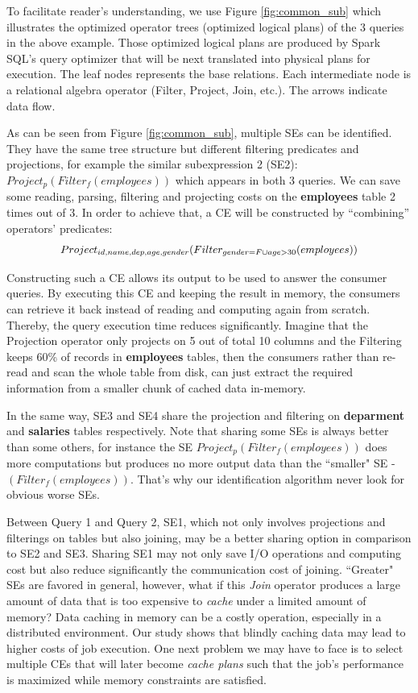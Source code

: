 To facilitate reader's understanding, we use Figure \ref{fig:common_sub} which illustrates the optimized operator trees (optimized logical plans) of the 3 queries in the above example. Those optimized logical plans are produced by Spark SQL's query optimizer that will be next translated into physical plans for execution. The leaf nodes represents the base relations. Each intermediate node is a relational algebra operator (Filter, Project, Join, etc.). The arrows indicate data flow.

As can be seen from Figure \ref{fig:common_sub}, multiple SEs can be identified. They have the same tree structure but different filtering predicates and projections, for example the similar subexpression 2 (SE2): $Project_p(Filter_f(employees))$ which appears in both 3 queries. We can save some reading, parsing, filtering and projecting costs on the \textbf{employees} table 2 times out of 3. In order to achieve that, a CE will be constructed by ``combining'' operators' predicates: 
\[\Scale[0.95]{Project_{id, name, dep, age, gender}(Filter_{gender=F \cup age>30}(employees))}\]

Constructing such a CE allows its output to be used to answer the consumer queries. By executing this CE and keeping the result in memory, the consumers can retrieve it back instead of reading and computing again from scratch. Thereby, the query execution time reduces significantly. Imagine that the Projection operator only projects on 5 out of total 10 columns and the Filtering keeps 60\% of records in \textbf{employees} tables, then the consumers rather than re-read and scan the whole table from disk, can just extract the required information from a smaller chunk of cached data in-memory. 

In the same way, SE3 and SE4 share the projection and filtering on \textbf{deparment} and  \textbf{salaries} tables respectively. Note that sharing some SEs is always better than some others, for instance the SE $Project_p(Filter_f(employees))$ does more computations but produces no more output data than the ``smaller" SE - $(Filter_f(employees))$. That's why our identification algorithm never look for obvious worse SEs.

Between Query 1 and Query 2, SE1, which not only involves projections and filterings on tables but also joining, may be a better sharing option in comparison to SE2 and SE3. Sharing SE1 may not only save I/O operations and computing cost but also reduce significantly the communication cost of joining. ``Greater" SEs are favored in general, however, what if this \emph{Join} operator produces a large amount of data that is too expensive to \emph{cache} under a limited amount of memory? Data caching in memory can be a costly operation, especially in a distributed environment. Our study shows that blindly caching data may lead to higher costs of job execution. One next problem we may have to face is to select multiple CEs that will later become \emph{cache plans} such that the job's performance is maximized while memory constraints are satisfied.

